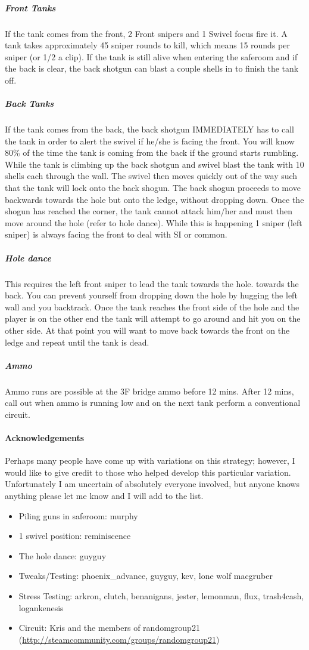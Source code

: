 \subparagraph{Front Tanks}
If the tank comes from the front, 2 Front snipers and 1 Swivel focus fire it. A tank takes approximately 45 sniper rounds to kill, which means 15 rounds per sniper (or 1/2 a clip). If the tank is still alive when entering the saferoom and if the back is clear, the back shotgun can blast a couple shells in to finish the tank off.

\subparagraph{Back Tanks}
If the tank comes from the back, the back shotgun IMMEDIATELY has to call the tank in order to alert the swivel if he/she is facing the front. You will know 80\% of the time the tank is coming from the back if the ground starts rumbling. While the tank is climbing up the back shotgun and swivel blast the tank with 10 shells each through the wall. The swivel then moves quickly out of the way such that the tank will lock onto the back shogun. The back shogun proceeds to move backwards towards the hole but onto the ledge, without dropping down. Once the shogun has reached the corner, the tank cannot attack him/her and must then move around the hole (refer to hole dance). While this is happening 1 sniper (left sniper) is always facing the front to deal with SI or common.

\subparagraph{Hole dance}
This requires the left front sniper to lead the tank towards the hole. towards the back. You can prevent yourself from dropping down the hole by hugging the left wall and you backtrack. Once the tank reaches the front side of the hole and the player is on the other end the tank will attempt to go around and hit you on the other side. At that point you will want to move back towards the front on the ledge and repeat until the tank is dead.

\subparagraph{Ammo}
Ammo runs are possible at the 3F bridge ammo before 12 mins.
After 12 mins, call out when ammo is running low and on the next tank perform a conventional circuit.

\paragraph{Acknowledgements}
Perhaps many people have come up with variations on this strategy; however, I would like to give credit to those who helped develop this particular variation. Unfortunately I am uncertain of absolutely everyone involved, but anyone knows anything please let me know and I will add to the list.

\begin{itemize}
\item Piling guns in saferoom: murphy
\item 1 swivel position: reminiscence
\item The hole dance: guyguy
\item Tweaks/Testing: phoenix\_advance, guyguy, kev, lone wolf macgruber
\item Stress Testing: arkron, clutch, benanigans, jester, lemonman, flux, trash4cash, logankenesis
\item Circuit: Kris and the members of randomgroup21 (\url{http://steamcommunity.com/groups/randomgroup21})
\end{itemize}

